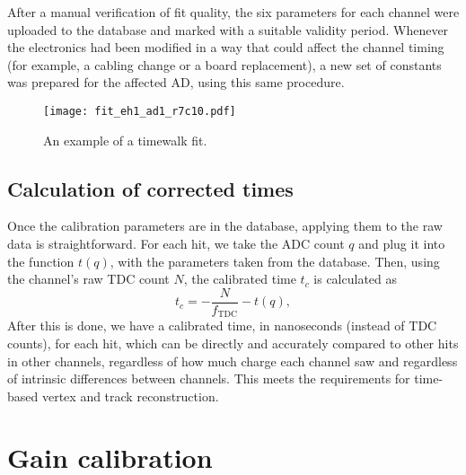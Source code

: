 \documentclass[../thesis.tex]{subfiles}
\begin{document}
After a manual verification of fit quality, the six parameters for each channel were uploaded to the database and marked with a suitable validity period. Whenever the electronics had been modified in a way that could affect the channel timing (for example, a cabling change or a board replacement), a new set of constants was prepared for the affected AD, using this same procedure.


\begin{figure}
  \texttt{[image: fit\_eh1\_ad1\_r7c10.pdf]}
  \caption{An example of a timewalk fit.}
  \label{fig:timewalk}
\end{figure}

\begin{comment}
  Show the tof-corrected times; comment on TDC discretization.
\end{comment}

\subsection{Calculation of corrected times}

Once the calibration parameters are in the database, applying them to the raw data is straightforward. For each hit, we take the ADC count $q$ and plug it into the function $t(q)$, with the parameters taken from the database. Then, using the channel's raw TDC count $N$, the calibrated time $t_c$ is calculated as
\begin{equation*}
  t_c = -\frac{N}{f_\mathrm{TDC}} - t(q),
\end{equation*}
After this is done, we have a calibrated time, in nanoseconds (instead of TDC counts), for each hit, which can be directly and accurately compared to other hits in other channels, regardless of how much charge each channel saw and regardless of intrinsic differences between channels. This meets the requirements for time-based vertex and track reconstruction.

\section{Gain calibration}
\end{document}
